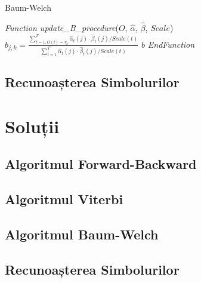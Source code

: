 \documentclass[12pt]{article}
\begin{document}
\begin{algorithm}[H]
  \caption{Baum-Welch}
  \label{alg-baum-welch-3}
   
  \begin{algorithmic}[1]
    \STATE \emph{Function update\_B\_procedure}($O$, $\hat{\alpha}$,
    $\hat{\beta}$, $Scale$)  
    \STATE $b_{j,k} = \frac{\sum_{t=1,O(t)=v_k}^{T}
      {\hat{\alpha}_t(j) \cdot \hat{\beta}_t(j) / Scale(t)}}
    {\sum_{t=1}^{T} {\hat{\alpha}_t(j) \cdot \hat{\beta}_t(j) /
        Scale(t)}}$
    \ENDFOR
    \ENDFOR
    \RETURN $b$ \STATE \emph{EndFunction}
  \end{algorithmic}
\end{algorithm}


\subsection{Recunoașterea Simbolurilor}
\label{sec:symbol-recognition}

\section{Soluții}
\label{sec:solutions}

\subsection{Algoritmul Forward-Backward}
\label{sec:fb-sol}

\subsection{Algoritmul Viterbi}
\label{sec:viterbi-sol}

\subsection{Algoritmul Baum-Welch}
\label{sec:baum-welch-sol}

\subsection{Recunoașterea Simbolurilor}
\label{sec:symbol-recognition-sol}
\end{document}
